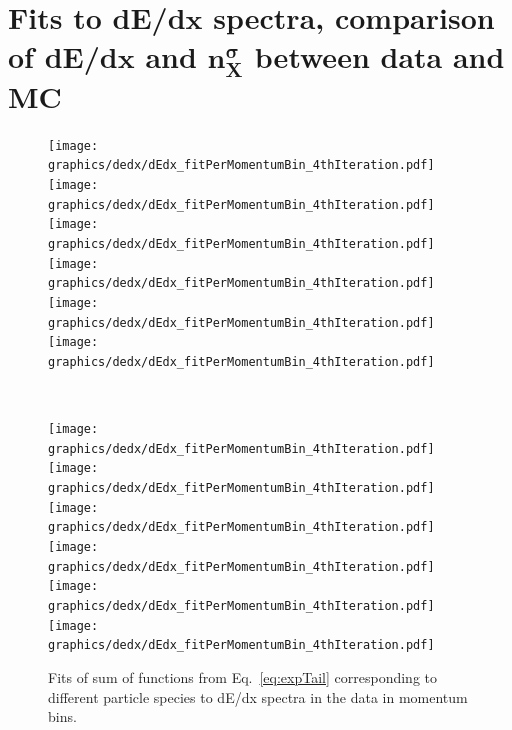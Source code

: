 
\chapter{Fits to \texorpdfstring{d$\bm{E}$/d$\bm{x}$}{dE/dx} spectra, comparison of \texorpdfstring{d$\bm{E}$/d$\bm{x}$}{dE/dx} and \texorpdfstring{$\bm{n}^{\bm{\sigma}}_{\bm{X}}$}{nSigmaX} between data and MC}\label{appendix:dEdxAdjustment}

\begin{figure}[hb]
\centering%
\caption[Fits to dE/dx spectra in the data.]{Fits of sum of functions from Eq.~\eqref{eq:expTail} corresponding to different particle species to dE/dx spectra in the data in  momentum bins.}\label{fig:dEdxFits}
\parbox{0.495\textwidth}{
  \centering
  \texttt{[image: graphics/dedx/dEdx\_fitPerMomentumBin\_4thIteration.pdf]}\\[3pt]
  \texttt{[image: graphics/dedx/dEdx\_fitPerMomentumBin\_4thIteration.pdf]}\\[3pt]
  \texttt{[image: graphics/dedx/dEdx\_fitPerMomentumBin\_4thIteration.pdf]}\\[3pt]
  \texttt{[image: graphics/dedx/dEdx\_fitPerMomentumBin\_4thIteration.pdf]}\\[3pt]
  \texttt{[image: graphics/dedx/dEdx\_fitPerMomentumBin\_4thIteration.pdf]}\\[3pt]
  \texttt{[image: graphics/dedx/dEdx\_fitPerMomentumBin\_4thIteration.pdf]}
}~
\parbox{0.495\textwidth}{
  \centering
  \texttt{[image: graphics/dedx/dEdx\_fitPerMomentumBin\_4thIteration.pdf]}\\[3pt]
  \texttt{[image: graphics/dedx/dEdx\_fitPerMomentumBin\_4thIteration.pdf]}\\[3pt]
  \texttt{[image: graphics/dedx/dEdx\_fitPerMomentumBin\_4thIteration.pdf]}\\[3pt]
  \texttt{[image: graphics/dedx/dEdx\_fitPerMomentumBin\_4thIteration.pdf]}\\[3pt]
  \texttt{[image: graphics/dedx/dEdx\_fitPerMomentumBin\_4thIteration.pdf]}\\[3pt]
  \texttt{[image: graphics/dedx/dEdx\_fitPerMomentumBin\_4thIteration.pdf]}
}\vspace{-400pt}%
\end{figure}

